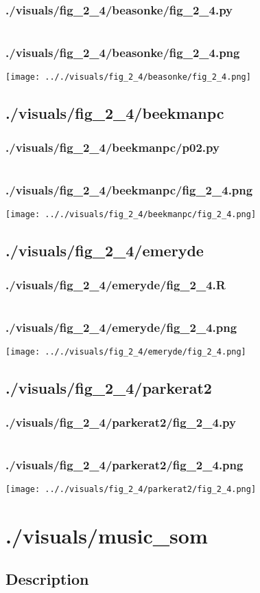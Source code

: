\documentclass{report}
\begin{document}
    \subsection{./visuals/fig\_2\_4/beasonke/fig\_2\_4.py}
    \inputminted[breaklines=true]{python}{.././visuals/fig_2_4/beasonke/fig_2_4.py}
    \subsection{./visuals/fig\_2\_4/beasonke/fig\_2\_4.png}
    \texttt{[image: .././visuals/fig\_2\_4/beasonke/fig\_2\_4.png]}
    \pagebreak
    \section{./visuals/fig\_2\_4/beekmanpc}
    \subsection{./visuals/fig\_2\_4/beekmanpc/p02.py}
    \inputminted[breaklines=true]{python}{.././visuals/fig_2_4/beekmanpc/p02.py}
    \subsection{./visuals/fig\_2\_4/beekmanpc/fig\_2\_4.png}
    \texttt{[image: .././visuals/fig\_2\_4/beekmanpc/fig\_2\_4.png]}
    \pagebreak
    \section{./visuals/fig\_2\_4/emeryde}
    \subsection{./visuals/fig\_2\_4/emeryde/fig\_2\_4.R}
    \inputminted[breaklines=true]{r}{.././visuals/fig_2_4/emeryde/fig_2_4.R}
    \subsection{./visuals/fig\_2\_4/emeryde/fig\_2\_4.png}
    \texttt{[image: .././visuals/fig\_2\_4/emeryde/fig\_2\_4.png]}
    \pagebreak
    \section{./visuals/fig\_2\_4/parkerat2}
    \subsection{./visuals/fig\_2\_4/parkerat2/fig\_2\_4.py}
    \inputminted[breaklines=true]{python}{.././visuals/fig_2_4/parkerat2/fig_2_4.py}
    \subsection{./visuals/fig\_2\_4/parkerat2/fig\_2\_4.png}
    \texttt{[image: .././visuals/fig\_2\_4/parkerat2/fig\_2\_4.png]}
    \chapter{./visuals/music\_som}
    \section{Description}
    \small
    
\end{document}
